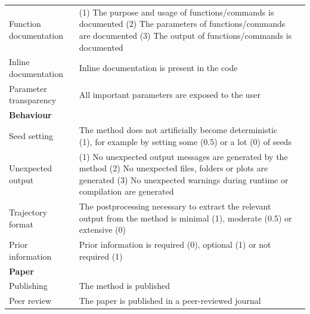 \begin{table}[tbh!]
\begin{tabular}{p{2.5cm}p{8cm}p{1.5cm}}
		Function documentation & (1) The purpose and usage of functions/commands is documented (2) The parameters of functions/commands are documented (3) The output of functions/commands is documented & \cite{wilson_bestpracticesscientific_2014,taschuk_tensimplerules_2017,wickham_packagesorganizetest_2015,silva_generalguidelinesbiomedical_2017,karimzadeh_topconsiderationscreating_2018}\\*
		
		Inline documentation & Inline documentation is present in the code & \cite{wilson_bestpracticesscientific_2014,taschuk_tensimplerules_2017,wickham_packagesorganizetest_2015,silva_generalguidelinesbiomedical_2017,karimzadeh_topconsiderationscreating_2018}\\*
		
		Parameter transparency & All important parameters are exposed to the user & \cite{taschuk_tensimplerules_2017}\\
		
		\midrule
		\multicolumn{3}{l}{\textbf{Behaviour}} \\*
		
		Seed setting & The method does not artificially become deterministic (1), for example by setting some (0.5) or a lot (0) of seeds & \cite{puget_greendiceare_2016}\\*
		
		Unexpected output & (1) No unexpected output messages are generated by the method (2) No unexpected files, folders or plots are generated (3) No unexpected warnings during runtime or compilation are generated & \cite{artaza_top10metrics_2016}\\*
		
		Trajectory format & The postprocessing necessary to extract the relevant output from the method is minimal (1), moderate (0.5) or extensive (0) & \\*
		
		Prior information & Prior information is required (0), optional (1) or not required (1) & \\*
		
		\midrule
		\multicolumn{3}{l}{\textbf{Paper}} \\*
		
		Publishing & The method is published & \\*
		
		Peer review & The paper is published in a peer-reviewed journal & \cite{karimzadeh_topconsiderationscreating_2018,gannon_essentialrolepeer_2001,baldwin_refereeswetrust_2017}\\*
		

\end{tabular}
\end{table}
